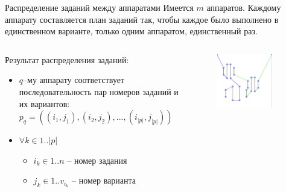 \documentclass{beamer}
\begin{document}
\begin{frame}{Распределение заданий между аппаратами}
Имеется $m$ аппаратов. Каждому аппарату составляется план заданий так, чтобы каждое было выполнено в единственном варианте, только одним аппаратом, единственный раз.
\begin{columns}[onlytextwidth, t]
    \begin{column}{0.6\textwidth}
        \linebreak
        Результат распределения заданий:
        \begin{itemize}
            \item $q$--му аппарату соответствует последовательность пар номеров заданий и их вариантов:
            $p_q = ((i_1, j_1), (i_2, j_2), ..., (i_{|p|}, j_{|p|}))$
            \item $\forall k \in 1..|p|~ $
            \begin{itemize}
                \item $i_k \in 1..n$ -- номер задания
                \item $j_k \in 1..v_{i_k}$  -- номер варианта
            \end{itemize}

        \end{itemize}

    \end{column}
    \begin{column}{0.4\textwidth}

        \begin{figure}[here]
            \includegraphics[scale=0.4]{images/hk2.png}
        \end{figure}
    \end{column}

​\end{columns}
\end{frame}
\end{document}
